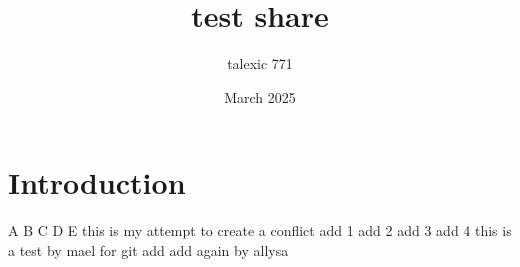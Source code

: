 \documentclass{article}
\title{test share}
\author{talexic 771 }
\date{March 2025}
\begin{document}
\maketitle

\section{Introduction}
A
B
C
D
E
this is my attempt to create a conflict
add 1
add 2
add 3
add 4
this is a test by mael for git
add
add again by allysa
\end{document}
